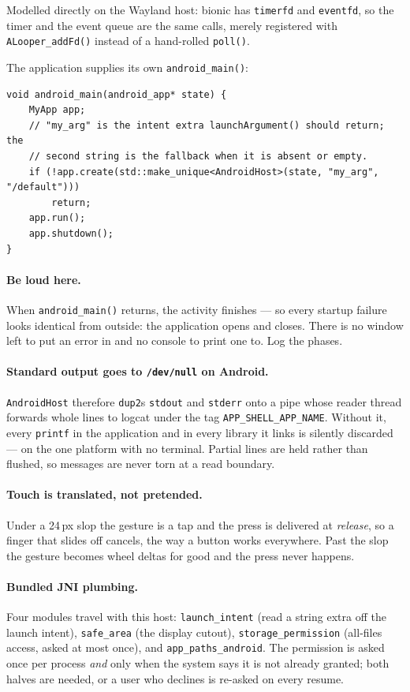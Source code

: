 \documentclass[11pt,a4paper]{article}
\begin{document}
Modelled directly on the Wayland host: bionic has \texttt{timerfd} and
\texttt{eventfd}, so the timer and the event queue are the same calls, merely
registered with \texttt{ALooper\_addFd()} instead of a hand-rolled
\texttt{poll()}.

The application supplies its own \texttt{android\_main()}:

\begin{lstlisting}
void android_main(android_app* state) {
    MyApp app;
    // "my_arg" is the intent extra launchArgument() should return; the
    // second string is the fallback when it is absent or empty.
    if (!app.create(std::make_unique<AndroidHost>(state, "my_arg", "/default")))
        return;
    app.run();
    app.shutdown();
}
\end{lstlisting}

\paragraph{Be loud here.} When \texttt{android\_main()} returns, the activity
finishes --- so every startup failure looks identical from outside: the
application opens and closes. There is no window left to put an error in and no
console to print one to. Log the phases.

\paragraph{Standard output goes to \texttt{/dev/null} on Android.}
\texttt{AndroidHost} therefore \texttt{dup2}s \texttt{stdout} and
\texttt{stderr} onto a pipe whose reader thread forwards whole lines to logcat
under the tag \texttt{APP\_SHELL\_APP\_NAME}. Without it, every
\texttt{printf} in the application and in every library it links is silently
discarded --- on the one platform with no terminal. Partial lines are held
rather than flushed, so messages are never torn at a read boundary.

\paragraph{Touch is translated, not pretended.} Under a 24\,px slop the gesture
is a tap and the press is delivered at \emph{release}, so a finger that slides
off cancels, the way a button works everywhere. Past the slop the gesture
becomes wheel deltas for good and the press never happens.

\paragraph{Bundled JNI plumbing.} Four modules travel with this host:
\texttt{launch\_intent} (read a string extra off the launch intent),
\texttt{safe\_area} (the display cutout), \texttt{storage\_permission}
(all-files access, asked at most once), and \texttt{app\_paths\_android}. The permission is asked once per process
\emph{and} only when the system says it is not already granted; both halves are
needed, or a user who declines is re-asked on every resume.
\end{document}
